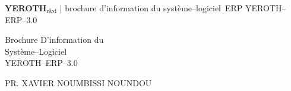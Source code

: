 \documentclass[a4paper, 10pt]{article}
\newcommand{\pos}{syst\`eme--logiciel~ERP\xspace}
\newcommand{\yerothrd}{\textcolor{yerothColorGreen}
			{\textsc{\textcolor{yerothColorRed}{YEROTH}}$_{\text{r\&d}}$\xspace}}
\newcommand{\yerotherpblack}{YEROTH--ERP--$3.0$\xspace}
\newcommand{\myfullacademicname}{PR. XAVIER NOUMBISSI NOUNDOU\xspace}
\begin{document}
\thispagestyle{OnlyFirstPage}


{\bf \LARGE \yerothrd} {| \sc \scriptsize brochure d'information du \pos \yerotherpblack}

\vspace{2.0em}

\begin{center}
{\LARGE Brochure D'information du \\
    \vspace{0.3em}
    Syst\`eme--Logiciel \\
    \vspace{0.5em}
    \yerotherpblack}
\end{center}

\vspace{2.0em}

\begin{center}
{\large \myfullacademicname}
\end{center}

\vspace{1.0em}
\end{document}
